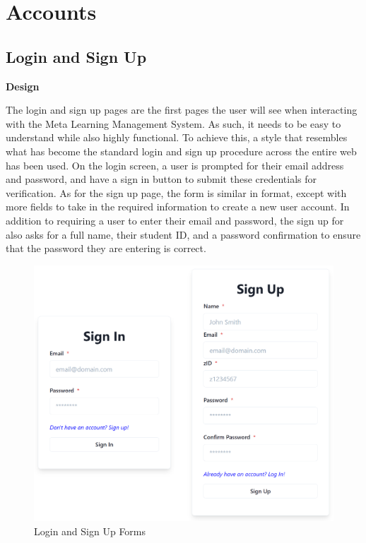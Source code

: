 \section{Accounts}

\subsection{Login and Sign Up}
\textbf{Design}

The login and sign up pages are the first pages the user will see when interacting with the Meta Learning Management System. As such, it needs to be easy to understand while also highly functional. To achieve this, a style that resembles what has become the standard login and sign up procedure across the entire web has been used. On the login screen, a user is prompted for their email address and password, and have a sign in button to submit these credentials for verification. As for the sign up page, the form is similar in format, except with more fields to take in the required information to create a new user account. In addition to requiring a user to enter their email and password, the sign up for also asks for a full name, their student ID, and a password confirmation to ensure that the password they are entering is correct.

\begin{figure}[h!]
    \centering
    \includegraphics[scale=0.25]{images/accounts-login.png}
    \caption{Login and Sign Up Forms}
\end{figure}

